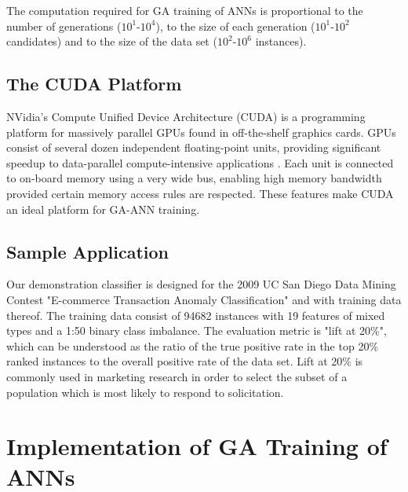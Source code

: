 \documentclass[11pt]{article}       %
\begin{document}
The computation required for GA training of ANNs is proportional to the number of generations ($10^1$-$10^4$), to the size of each generation ($10^1$-$10^2$ candidates) and to the size of the data set ($10^2$-$10^6$ instances).

\subsection{The CUDA Platform} \label{cuda}
NVidia's Compute Unified Device Architecture (CUDA) is a programming platform for massively parallel GPUs found in off-the-shelf graphics cards. GPUs consist of several dozen independent floating-point units, providing significant speedup to data-parallel compute-intensive applications \cite{cuda}. Each unit is connected to on-board memory using a very wide bus, enabling high memory bandwidth provided certain memory access rules are respected. These features make CUDA an ideal platform for GA-ANN training.

\subsection{Sample Application} \label{contest}
Our demonstration classifier is designed for the 2009 UC San Diego Data Mining Contest "E-commerce Transaction Anomaly Classification" \cite{UCSG-Contest} and with training data thereof. The training data consist of 94682 instances with 19 features of mixed types and a 1:50 binary class imbalance. The evaluation metric is "lift at 20\%", which can be understood as the ratio of the true positive rate in the top 20\% ranked instances to the overall positive rate of the data set.  Lift at 20\% is commonly used in marketing research in order to select the subset of a population which is most likely to respond to solicitation.

\section{Implementation of GA Training of ANNs} \label{algimp}
\end{document}
